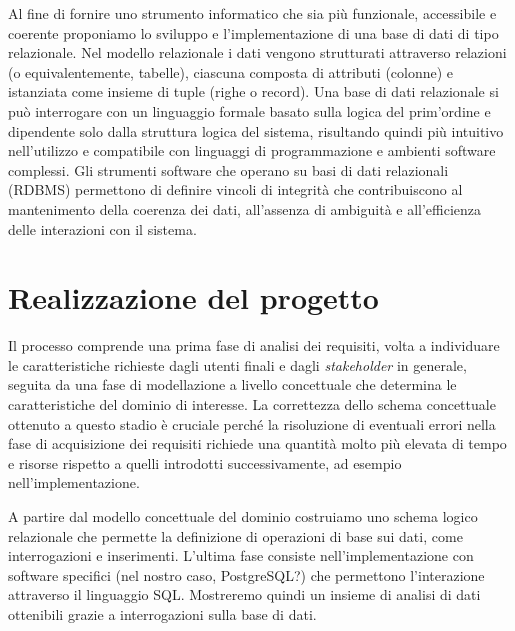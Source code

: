 Al fine di fornire uno strumento informatico che sia più funzionale, accessibile e coerente proponiamo lo sviluppo e l'implementazione di una base di dati di tipo relazionale.
Nel modello relazionale \cite{Cod70} i dati vengono strutturati attraverso relazioni (o equivalentemente, tabelle), ciascuna composta di attributi (colonne) e istanziata come insieme di tuple (righe o record).
Una base di dati relazionale si può interrogare con un linguaggio formale basato sulla logica del prim'ordine e dipendente solo dalla struttura logica del sistema, risultando quindi più intuitivo nell'utilizzo e compatibile con linguaggi di programmazione e ambienti software complessi.
Gli strumenti software che operano su basi di dati relazionali (RDBMS) permettono di definire vincoli di integrità che contribuiscono al mantenimento della coerenza dei dati, all'assenza di ambiguità e all'efficienza delle interazioni con il sistema.

\section{Realizzazione del progetto}

Il processo comprende una prima fase di analisi dei requisiti, volta a individuare le caratteristiche richieste dagli utenti finali e dagli \emph{stakeholder} in generale, seguita da una fase di modellazione a livello concettuale che determina le caratteristiche del dominio di interesse.
La correttezza dello schema concettuale ottenuto a questo stadio è cruciale perché la risoluzione di eventuali errori nella fase di acquisizione dei requisiti richiede una quantità molto più elevata di tempo e risorse rispetto a quelli introdotti successivamente, ad esempio nell'implementazione.

A partire dal modello concettuale del dominio costruiamo uno schema logico relazionale che permette la definizione di operazioni di base sui dati, come interrogazioni e inserimenti.
L'ultima fase consiste nell'implementazione con software specifici (nel nostro caso, PostgreSQL?) che permettono l'interazione attraverso il linguaggio SQL.
Mostreremo quindi un insieme di analisi di dati ottenibili grazie a interrogazioni sulla base di dati.

